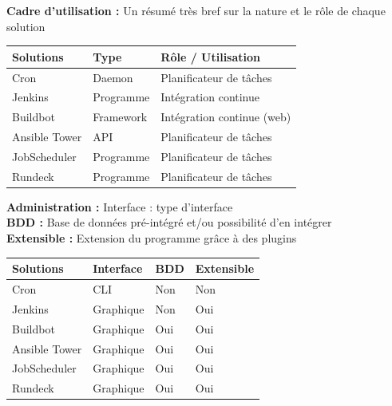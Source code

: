 \documentclass[12pt]{article}
\begin{document}
\vspace{0.5cm}

\textbf{Cadre d'utilisation :}
Un résumé très bref sur la nature et le rôle de chaque solution
\vspace{0.5cm}
\\
\begin{center}
\begin{tabular}{|l|l|l|}
\hline
Solutions     & Type      & Rôle / Utilisation         \\ \hline
Cron          & Daemon    & Planificateur de tâches    \\ \hline
Jenkins       & Programme & Intégration continue       \\ \hline
Buildbot      & Framework & Intégration continue (web) \\ \hline
Ansible Tower & API       & Planificateur de tâches    \\ \hline
JobScheduler  & Programme & Planificateur de tâches    \\ \hline
Rundeck       & Programme & Planificateur de tâches    \\ \hline
\end{tabular}
\end{center}

\vspace{0.5cm}

\textbf{Administration :}
Interface : type d'interface 
\vspace{0.2cm}
\\
\textbf{BDD :} Base de données pré-intégré et/ou possibilité d'en intégrer
\vspace{0.2cm}
\\
\textbf{Extensible :} Extension du programme grâce à des plugins
\vspace{0.5cm}
\\
\begin{center}
\begin{tabular}{|l|l|l|l|}
\hline
Solutions     & Interface & BDD & Extensible \\ \hline
Cron          & CLI       & Non & Non        \\ \hline
Jenkins       & Graphique & Non & Oui        \\ \hline
Buildbot      & Graphique & Oui & Oui        \\ \hline
Ansible Tower & Graphique & Oui & Oui        \\ \hline
JobScheduler  & Graphique & Oui & Oui        \\ \hline
Rundeck       & Graphique & Oui & Oui        \\ \hline
\end{tabular}
\end{center}
\end{document}
